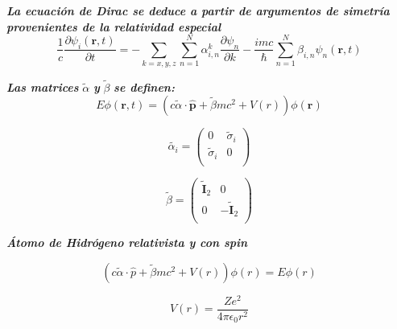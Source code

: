 \documentclass{beamer}
\begin{document}
\begin{frame}{\textit{\textbf{La ecuaci\'on de Dirac se deduce a partir de argumentos de simetr\'ia provenientes de la relatividad especial}}}
\[
\dfrac{1}{c}\dfrac{\partial \psi_i(\mathbf{r},t)}{\partial t} =
- \sum \limits_{k=x,y,z} \sum \limits_{n=1}^{N}\alpha^k_{i,n} \dfrac{\partial \psi_n}{\partial k} -
\dfrac{imc}{\hbar}\sum \limits_{n=1}^{N}\beta_{i,n}\psi_n(\mathbf{r}, t)
\]
\end{frame}

\begin{frame}{\textit{\textbf{Las matrices}} $\widetilde{\alpha}$ \textit{\textbf{y}} $\widetilde{\beta}$ \textit{\textbf{se definen:}}}
\begin{equation}
E\phi(\mathbf{r},t) =
(c\widetilde{\alpha}\cdot \hat{\mathbf{p}} + \widetilde{\beta}mc^2 + V(r))\phi(\mathbf{r})
\end{equation}

\begin{equation}
\widetilde{\alpha_i}=
\begin{pmatrix}
0 & \widetilde{\sigma}_i\\
\widetilde{\sigma}_i & 0 \\
\end{pmatrix}
\end{equation}

\begin{equation}
\widetilde{\beta}=
\begin{pmatrix}
\widetilde{\mathbf{I}}_2 & 0\\
0 & -\widetilde{\mathbf{I}}_2 \\
\end{pmatrix}
\end{equation}

\end{frame}

\begin{frame}{\textit{\textbf{\'Atomo de Hidr\'ogeno relativista y con spin}}}

\[
(c \widetilde{\alpha} \cdot \hat{p} + \widetilde{\beta} m c^2 + V(r) ) \phi(r) = E \phi (r)
\]

\begin{equation}
V(r) = \dfrac{Ze^2}{4\pi\epsilon_0 r^2}
\end{equation}
\end{frame}
\end{document}
